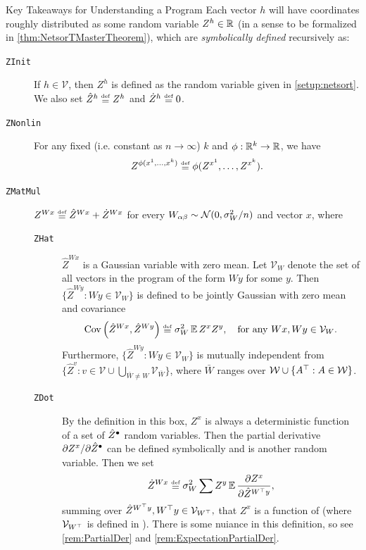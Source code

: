 \documentclass[main.tex]{subfiles}
\begin{document}
\begin{pabox}[defn:Z]{Key Takeaways for Understanding a \netsort{} Program}
    Each vector $h$ will have coordinates roughly distributed as some random variable $Z^{h} \in \mathbb{R}$ (in a sense to be formalized in \cref{thm:NetsorTMasterTheorem}), which are \emph{symbolically defined} recursively as:
    \begin{description}
    \item [\texttt{ZInit}\label{Z:Initial}] If $h\in\mathcal{V}$, then $Z^{h}$ is defined as the random variable given in \cref{setup:netsort}. We also set $\hat{Z}^{h}\defeq Z^{h}$ and $\Zdot^{h}\defeq 0$.
    \item [\texttt{ZNonlin}\label{Z:Nonlin}] For any fixed (i.e. constant as $n\to\infty$) $k$ and $\phi:\mathbb{R}^{k}\to\mathbb{R}$, we have
    \[
    Z^{\phi(x^{1},\ldots,x^{k})}\defeq \phi(Z^{x^{1}},\ldots,Z^{x^{k}}).
    \]
    \item [\texttt{ZMatMul}\label{Z:MatMul}] $Z^{Wx}\defeq \hat{Z}^{Wx}+\Zdot^{Wx}$
    for every $W_{\alpha\beta}\sim\mathcal{N}(0,\sigma_{W}^{2}/n)$ and vector $x$, where
    \begin{description}
    \item [\texttt{ZHat}\label{Z:Zhat}] {$\hat{Z}^{Wx}$} is a Gaussian variable with zero mean. Let $\mathcal V_W$ denote the set of all vectors in the program of the form $W y$ for some $y$.
    Then $\{\hat Z^{W y}: W y \in \mathcal V_W\}$ is defined to be jointly Gaussian with zero mean and covariance
    \[
    \Cov\left(\hat{Z}^{Wx},\hat{Z}^{W y}\right)\defeq \sigma_{W}^{2}\EV Z^{x}Z^{y},\quad\text{for any \ensuremath{Wx,W y\in\mathcal{V}_W}.}
    \]
    Furthermore, $\{\hat Z^{W y}: W y \in \mathcal V_W\}$ is mutually independent from $\{\hat Z^{v }: v \in \mathcal V \cup \bigcup_{\bar W \ne W} \mathcal V_{\bar W}\}$, where $\bar{W}$ ranges over $\mathcal{W}\cup\{A^{\top}:A\in\mathcal{W}\}$.
    \item [\texttt{ZDot}\label{Z:Zdot}]
    By the definition in this box, $Z^x$ is always a deterministic function of a set of $\hat Z^{\bullet}$ random variables.
    Then the partial derivative $\partial Z^x / \partial \hat Z^\bullet$ can be defined symbolically and is another random variable.
    Then we set
    \[\Zdot^{Wx}\defeq \sigma_{W}^{2}\sum Z^{y}\EV\frac{\partial Z^{x}}{\partial\hat{Z}^{W^{\trsp}y}},\]
    summing over $\hat Z^{W^\top y}, W^\top y \in \mathcal V_{W^\top},$ that $Z^x$ is a function of (where $\mathcal V_{W^\top}$ is defined in ).
    There is some nuiance in this definition, so see \cref{rem:PartialDer} and \ref{rem:ExpectationPartialDer}.
    \end{description}
    \end{description}
\end{pabox}
\end{document}
